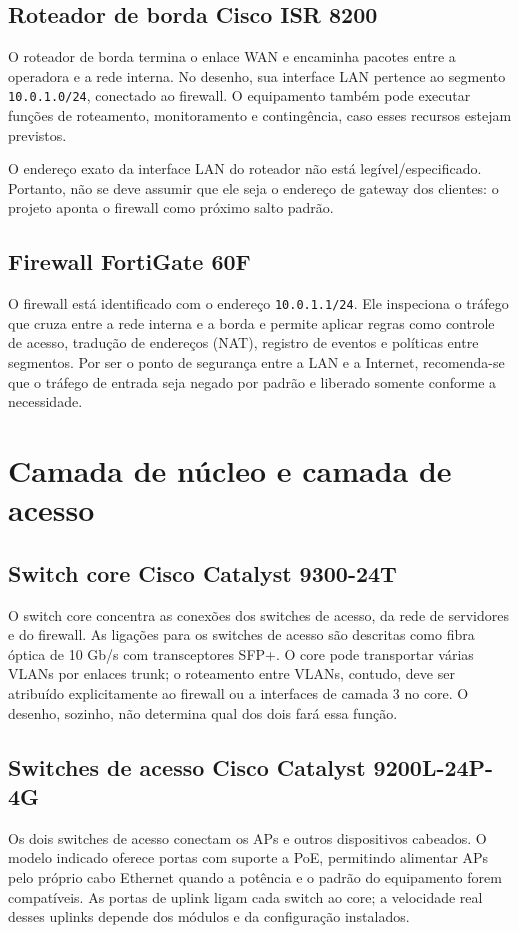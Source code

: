 \documentclass[11pt,a4paper]{article}
\begin{document}
\subsection{Roteador de borda Cisco ISR 8200}
O roteador de borda termina o enlace WAN e encaminha pacotes entre a operadora e a rede interna. No desenho, sua interface LAN pertence ao segmento \texttt{10.0.1.0/24}, conectado ao firewall. O equipamento também pode executar funções de roteamento, monitoramento e contingência, caso esses recursos estejam previstos.

O endereço exato da interface LAN do roteador não está legível/especificado. Portanto, não se deve assumir que ele seja o endereço de gateway dos clientes: o projeto aponta o firewall como próximo salto padrão.

\subsection{Firewall FortiGate 60F}
O firewall está identificado com o endereço \texttt{10.0.1.1/24}. Ele inspeciona o tráfego que cruza entre a rede interna e a borda e permite aplicar regras como controle de acesso, tradução de endereços (NAT), registro de eventos e políticas entre segmentos. Por ser o ponto de segurança entre a LAN e a Internet, recomenda-se que o tráfego de entrada seja negado por padrão e liberado somente conforme a necessidade.

\section{Camada de núcleo e camada de acesso}

\subsection{Switch core Cisco Catalyst 9300-24T}
O switch core concentra as conexões dos switches de acesso, da rede de servidores e do firewall. As ligações para os switches de acesso são descritas como fibra óptica de 10 Gb/s com transceptores SFP+. O core pode transportar várias VLANs por enlaces trunk; o roteamento entre VLANs, contudo, deve ser atribuído explicitamente ao firewall ou a interfaces de camada 3 no core. O desenho, sozinho, não determina qual dos dois fará essa função.

\subsection{Switches de acesso Cisco Catalyst 9200L-24P-4G}
Os dois switches de acesso conectam os APs e outros dispositivos cabeados. O modelo indicado oferece portas com suporte a PoE, permitindo alimentar APs pelo próprio cabo Ethernet quando a potência e o padrão do equipamento forem compatíveis. As portas de uplink ligam cada switch ao core; a velocidade real desses uplinks depende dos módulos e da configuração instalados.
\end{document}

